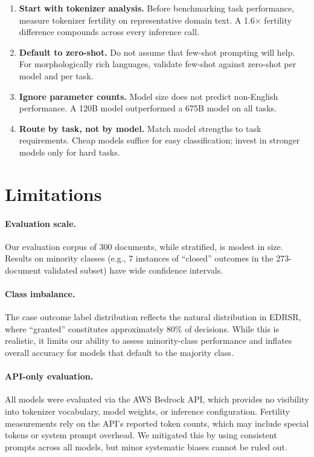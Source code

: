 \documentclass[11pt,a4paper]{article}
\begin{document}
\begin{enumerate}[leftmargin=*]
    \item \textbf{Start with tokenizer analysis.} Before benchmarking task performance, measure tokenizer fertility on representative domain text. A 1.6$\times$ fertility difference compounds across every inference call.
    \item \textbf{Default to zero-shot.} Do not assume that few-shot prompting will help. For morphologically rich languages, validate few-shot against zero-shot per model and per task.
    \item \textbf{Ignore parameter counts.} Model size does not predict non-English performance. A 120B model outperformed a 675B model on all tasks.
    \item \textbf{Route by task, not by model.} Match model strengths to task requirements. Cheap models suffice for easy classification; invest in stronger models only for hard tasks.
\end{enumerate}

\section{Limitations}

\paragraph{Evaluation scale.} Our evaluation corpus of 300 documents, while stratified, is modest in size. Results on minority classes (e.g., 7 instances of ``closed'' outcomes in the 273-document validated subset) have wide confidence intervals.

\paragraph{Class imbalance.} The case outcome label distribution reflects the natural distribution in EDRSR, where ``granted'' constitutes approximately 80\% of decisions. While this is realistic, it limits our ability to assess minority-class performance and inflates overall accuracy for models that default to the majority class.

\paragraph{API-only evaluation.} All models were evaluated via the AWS Bedrock API, which provides no visibility into tokenizer vocabulary, model weights, or inference configuration. Fertility measurements rely on the API's reported token counts, which may include special tokens or system prompt overhead. We mitigated this by using consistent prompts across all models, but minor systematic biases cannot be ruled out.
\end{document}
